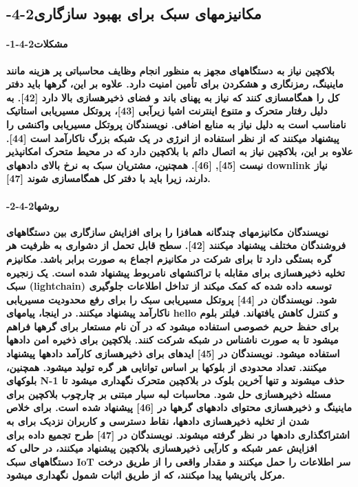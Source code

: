 \documentclass{article} %
\begin{document}
\noindent 
\subsection{ -4-2مکانیزمهای سبک برای بهبود سازگاری}

\noindent 
\paragraph{ -1-4-2مشکلات}

\noindent 
{\bf بلاکچین نیاز به دستگاههای مجهز به منظور انجام وظایف محاسباتی پر هزینه مانند ماینینگ، رمزنگاری و هشکردن برای تأمین امنیت دارد. علاوه بر این، گرهها باید دفتر کل را همگامسازی کنند که نیاز به پهنای باند و فضای ذخیرهسازی بالا دارد [42]. به دلیل رفتار متحرک و متنوع اینترنت اشیا زیرآبی [43]، پروتکل مسیریابی استاتیک نامناسب است به دلیل نیاز به منابع اضافی. نویسندگان پروتکل مسیریابی واکنشی را پیشنهاد میکنند که از نظر استفاده از انرژی در یک شبکه بزرگ ناکارآمد است [44]. علاوه بر این، بلاکچین نیاز به اتصال دائم با بلاکچین دارد که در محیط متحرک امکانپذیر نیست [45], [46]. همچنین، مشتریان سبک به نرخ بالای دادههای downlink نیاز دارند، زیرا باید با دفتر کل همگامسازی شوند [47].}

\noindent 
\paragraph{ -2-4-2روشها}

\noindent 
{\bf نویسندگان مکانیزمهای چندگانه همافزا را برای افزایش سازگاری بین دستگاههای فروشندگان مختلف پیشنهاد میکنند [42]. سطح قابل تحمل از دشواری به ظرفیت هر گره بستگی دارد تا برای شرکت در مکانیزم اجماع به صورت برابر باشد. مکانیزم تخلیه ذخیرهسازی برای مقابله با تراکنشهای نامربوط پیشنهاد شده است. یک زنجیره سبک (lightchain) توسعه داده شده که کمک میکند از تداخل اطلاعات جلوگیری شود. نویسندگان در [44] پروتکل مسیریابی سبک را برای رفع محدودیت مسیریابی ناکارآمد پیشنهاد میکنند. در اینجا، پیامهای hello و کنترل کاهش یافتهاند. فیلتر بلوم برای حفظ حریم خصوصی استفاده میشود که در آن نام مستعار برای گرهها فراهم میشود تا به صورت ناشناس در شبکه شرکت کنند. بلاکچین برای ذخیره امن دادهها استفاده میشود. نویسندگان در [45] ایدهای برای ذخیرهسازی کارآمد دادهها پیشنهاد میکنند. تعداد محدودی از بلوکها بر اساس توانایی هر گره تولید میشود. همچنین، بلوکهای N-1 حذف میشوند و تنها آخرین بلوک در بلاکچین متحرک نگهداری میشود تا مسئله ذخیرهسازی حل شود. محاسبات لبه سیار مبتنی بر چارچوب بلاکچین برای ماینینگ و ذخیرهسازی محتوای دادههای گرهها در [46] پیشنهاد شده است. برای خلاص شدن از تخلیه ذخیرهسازی دادهها، نقاط دسترسی و کاربران نزدیک برای به اشتراکگذاری دادهها در نظر گرفته میشوند. نویسندگان در [47] طرح تجمیع داده برای افزایش عمر شبکه و کارآیی ذخیرهسازی بلاکچین پیشنهاد میکنند، در حالی که دستگاههای سبک IoT سر اطلاعات را حمل میکنند و مقدار واقعی را از طریق درخت مرکل پاتریشیا پیدا میکنند، که از طریق اثبات شمول نگهداری میشود.}
\end{document}
